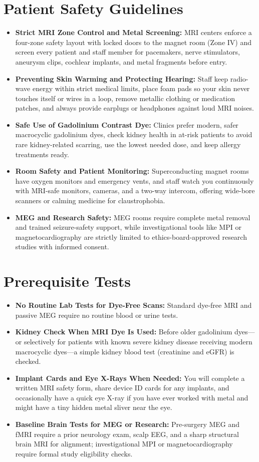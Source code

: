 \section{Patient Safety Guidelines}
\begin{itemize}
  \item \textbf{Strict MRI Zone Control and Metal Screening:} MRI centers enforce a four-zone safety layout with locked doors to the magnet room (Zone IV) and screen every patient and staff member for pacemakers, nerve stimulators, aneurysm clips, cochlear implants, and metal fragments before entry.
  \item \textbf{Preventing Skin Warming and Protecting Hearing:} Staff keep radio-wave energy within strict medical limits, place foam pads so your skin never touches itself or wires in a loop, remove metallic clothing or medication patches, and always provide earplugs or headphones against loud MRI noises.
  \item \textbf{Safe Use of Gadolinium Contrast Dye:} Clinics prefer modern, safer macrocyclic gadolinium dyes, check kidney health in at-risk patients to avoid rare kidney-related scarring, use the lowest needed dose, and keep allergy treatments ready.
  \item \textbf{Room Safety and Patient Monitoring:} Superconducting magnet rooms have oxygen monitors and emergency vents, and staff watch you continuously with MRI-safe monitors, cameras, and a two-way intercom, offering wide-bore scanners or calming medicine for claustrophobia.
  \item \textbf{MEG and Research Safety:} MEG rooms require complete metal removal and trained seizure-safety support, while investigational tools like MPI or magnetocardiography are strictly limited to ethics-board-approved research studies with informed consent.
\end{itemize}

\section{Prerequisite Tests}
\begin{itemize}
  \item \textbf{No Routine Lab Tests for Dye-Free Scans:} Standard dye-free MRI and passive MEG require no routine blood or urine tests.
  \item \textbf{Kidney Check When MRI Dye Is Used:} Before older gadolinium dyes---or selectively for patients with known severe kidney disease receiving modern macrocyclic dyes---a simple kidney blood test (creatinine and eGFR) is checked.
  \item \textbf{Implant Cards and Eye X-Rays When Needed:} You will complete a written MRI safety form, share device ID cards for any implants, and occasionally have a quick eye X-ray if you have ever worked with metal and might have a tiny hidden metal sliver near the eye.
  \item \textbf{Baseline Brain Tests for MEG or Research:} Pre-surgery MEG and fMRI require a prior neurology exam, scalp EEG, and a sharp structural brain MRI for alignment; investigational MPI or magnetocardiography require formal study eligibility checks.
\end{itemize}

